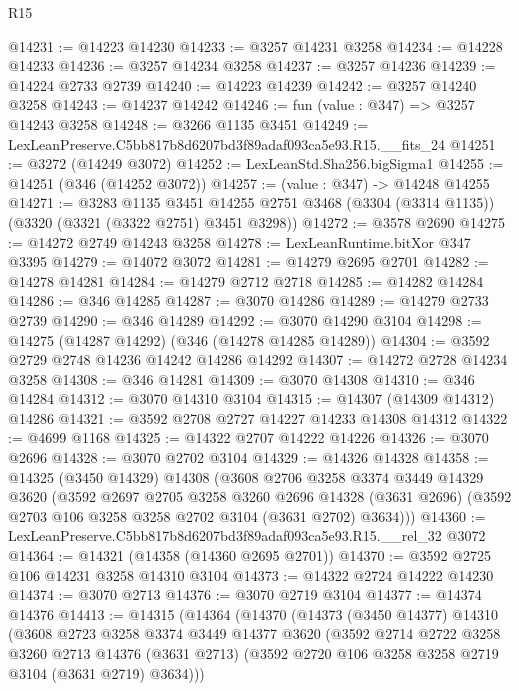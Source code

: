 \begin{lexlean}{R15}
\begin{coremodule}
@14231 := @14223 @14230
@14233 := @3257 @14231 @3258
@14234 := @14228 @14233
@14236 := @3257 @14234 @3258
@14237 := @3257 @14236
@14239 := @14224 @2733 @2739
@14240 := @14223 @14239
@14242 := @3257 @14240 @3258
@14243 := @14237 @14242
@14246 := fun (value : @347) => @3257 @14243 @3258
@14248 := @3266 @1135 @3451
@14249 := LexLeanPreserve.C5bb817b8d6207bd3f89adaf093ca5e93.R15.__fits_24
@14251 := @3272 (@14249 @3072)
@14252 := LexLeanStd.Sha256.bigSigma1
@14255 := @14251 (@346 (@14252 @3072))
@14257 := (value : @347) -> @14248 @14255
@14271 := @3283
    @1135
    @3451
    @14255
    @2751
    @3468
    (@3304 (@3314 @1135))
    (@3320 (@3321 (@3322 @2751) @3451 @3298))
@14272 := @3578 @2690
@14275 := @14272 @2749 @14243 @3258
@14278 := LexLeanRuntime.bitXor @347 @3395
@14279 := @14072 @3072
@14281 := @14279 @2695 @2701
@14282 := @14278 @14281
@14284 := @14279 @2712 @2718
@14285 := @14282 @14284
@14286 := @346 @14285
@14287 := @3070 @14286
@14289 := @14279 @2733 @2739
@14290 := @346 @14289
@14292 := @3070 @14290 @3104
@14298 := @14275 (@14287 @14292) (@346 (@14278 @14285 @14289))
@14304 := @3592 @2729 @2748 @14236 @14242 @14286 @14292
@14307 := @14272 @2728 @14234 @3258
@14308 := @346 @14281
@14309 := @3070 @14308
@14310 := @346 @14284
@14312 := @3070 @14310 @3104
@14315 := @14307 (@14309 @14312) @14286
@14321 := @3592 @2708 @2727 @14227 @14233 @14308 @14312
@14322 := @4699 @1168
@14325 := @14322 @2707 @14222 @14226
@14326 := @3070 @2696
@14328 := @3070 @2702 @3104
@14329 := @14326 @14328
@14358 := @14325
    (@3450 @14329)
    @14308
    (@3608
      @2706
      @3258
      @3374
      @3449
      @14329
      @3620
      (@3592
        @2697
        @2705
        @3258
        @3260
        @2696
        @14328
        (@3631 @2696)
        (@3592 @2703 @106 @3258 @3258 @2702 @3104 (@3631 @2702) @3634)))
@14360 := LexLeanPreserve.C5bb817b8d6207bd3f89adaf093ca5e93.R15.__rel_32 @3072
@14364 := @14321 (@14358 (@14360 @2695 @2701))
@14370 := @3592 @2725 @106 @14231 @3258 @14310 @3104
@14373 := @14322 @2724 @14222 @14230
@14374 := @3070 @2713
@14376 := @3070 @2719 @3104
@14377 := @14374 @14376
@14413 := @14315
    (@14364
      (@14370
        (@14373
          (@3450 @14377)
          @14310
          (@3608
            @2723
            @3258
            @3374
            @3449
            @14377
            @3620
            (@3592
              @2714
              @2722
              @3258
              @3260
              @2713
              @14376
              (@3631 @2713)
              (@3592 @2720 @106 @3258 @3258 @2719 @3104 (@3631 @2719) @3634)))

\end{coremodule}
\end{lexlean}
